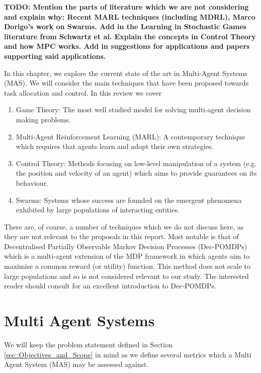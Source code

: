 \documentclass[.../main.tex]{subfiles}
\begin{document}
\textbf{TODO: Mention the parts of literature which we are not considering and explain why: Recent
MARL techniques (including MDRL), Marco Dorigo's work on Swarms. Add in the Learning in Stochastic
Games literature from Schwartz et al. Explain the concepts in Control Theory and how MPC works. Add
in suggestions for applications and papers supporting said applications.}

In this chapter, we explore the current state of the art in
Multi-Agent Systems (MAS). We will consider the main techniques that
have been proposed towards task allocation and control. In this review we cover

\begin{enumerate}
    \item Game Theory: The most well studied model for solving multi-agent decision making problems.
    \item Multi-Agent Reinforcement Learning (MARL): A contemporary technique which requires that
    agents learn and adopt their own strategies.
    \item Control Theory: Methods focusing on low-level manipulation of a system (e.g. the position
    and velocity of an agent) which aims to provide guarantees on its behaviour.
    \item Swarms: Systems whose success are founded on the emergent phenomena exhibited by large
    populations of interacting entities.
\end{enumerate}

There are, of course, a number of techniques which we do not discuss here, as they are not relevant
to the proposals in this report. Most notable is that of Decentralised Partially Observable Markov
Decision Processes (Dec-POMDPs) which is a multi-agent extension of the MDP framework in which
agents aim to maximise a common reward (or utility) function. This method does not scale to large
populations and so is not considered relevant to our study. The interested reader should consult
\cite{OliehoekDecentralizedPOMDPs} for an excellent introduction to Dec-POMDPs.

\section{Multi Agent Systems} \label{sec::Multi_Agent_Systems}

We will keep the problem statement defined in Section \ref{sec::Objectives_and_Scope} in mind as
we define several metrics which a Multi Agent System (MAS) may be assessed against.
\end{document}
